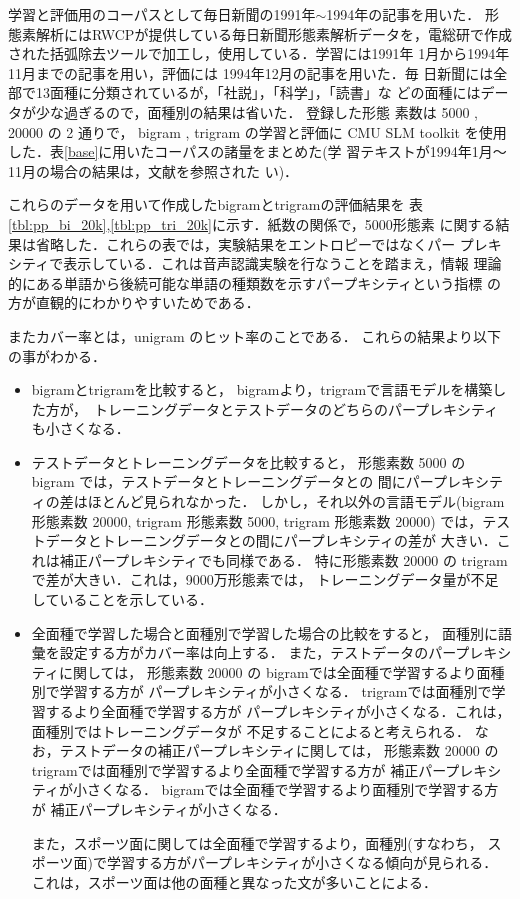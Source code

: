 学習と評価用のコーパスとして毎日新聞の1991年$\sim$1994年の記事を用いた．
形態素解析にはRWCPが提供している毎日新聞形態素解析データを，電総研で作成
された括弧除去ツールで加工し，使用している\cite{test17}．学習には1991年
\mbox{1月から1994年11}月までの記事を用い，評価には 1994年12月の記事を用いた．毎
\mbox{日新聞には全部で13面種に分}類されているが，「社説」，「科学」，「読書」な
どの面種にはデータが少な過ぎるので，面種別の結果は省いた． 登録した形態
素数は 5000 , 20000 の 2 通りで， bigram , trigram の学習と評価に CMU
SLM toolkit を使用した．表\ref{base}に用いたコーパスの諸量をまとめた(学
\mbox{習テキストが}1994年1月〜11月の場合の結果は，文献\cite{test26}を参照された
い)．

これらのデータを用いて作成したbigramとtrigramの評価結果を
表\ref{tbl:pp_bi_20k},\ref{tbl:pp_tri_20k}に示す．\mbox{紙数の関係}で，5000形態素
に関する結果は省略した．これらの表では，実験結果をエントロピーではなくパー
プレキシティで表示している．これは音声認識実験を行なうことを踏まえ，情報
理論的にある単語から後続可能な単語の種類数を示すパープキシティという指標
の方が直観的にわかりやすいためである．

またカバー率とは，unigram のヒット率のことである．
これらの結果より以下の事がわかる．

\begin{itemize}
 \item bigramとtrigramを比較すると，
       bigramより，\mbox{trigramで言語モデルを構築した方が，
       ト}レーニングデータとテストデータのどちらのパープレキシティも小さくなる．
 \item テストデータとトレーニングデータを比較すると，
       形態素数 5000 の bigram では，テストデータとトレーニングデータとの
       間にパープレキシティの差はほとんど見られなかった．
       しかし，それ以外の言語モデル(bigram 形態素数 20000, 
       trigram 形態素数 5000, trigram 形態素数 20000)
       では，テストデータとトレーニングデータとの間にパープレキシティの差が
       大きい．これは補正パープレキシティでも同様である．
       特に形態素数 20000 の trigram で差が大きい．これは，9000万形態素では，
       トレーニングデータ量が不足していることを示している．
 \item 全面種で学習した場合と面種別で学習した場合の比較をすると，
       面種別に語彙を設定する方がカバー率は向上する．
       また，テストデータのパープレキシティに関しては，
       形態素数 20000 の bigramでは全面種で学習するより面種別で学習する方が
       パープレキシティが小さくなる．
       trigramでは面種別で学習するより全面種で学習する方が
       パープレキシティが小さくなる．これは，面種別ではトレーニングデータが
       不足することによると考えられる．
       なお，テストデータの補正パープレキシティに関しては，
       形態素数 20000 の trigramでは面種別で学習するより全面種で学習する方が
       補正パープレキシティが小さくなる．
       bigramでは全面種で学習するより面種別で学習する方が
       補正パープレキシティが小さくなる．
       
       また，スポーツ面に関しては全面種で学習するより，面種別(すなわち，
       スポーツ面)で学習する方がパープレキシティが小さくなる傾向が見られる．
       これは，スポーツ面は他の面種と異なった文が多いことによる．
\end{itemize}


